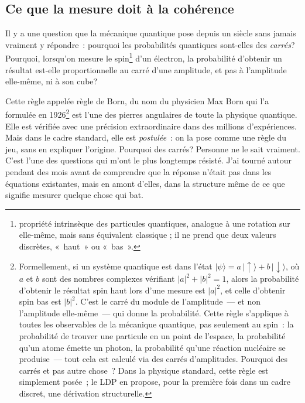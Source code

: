 \documentclass[12pt, a4paper, openright]{book}
\begin{document}
\subsection*{Ce que la mesure doit à la cohérence}

Il y a une question que la mécanique quantique pose depuis un siècle sans jamais vraiment y répondre~: pourquoi les probabilités quantiques sont-elles des \emph{carrés}? Pourquoi, lorsqu'on mesure le spin\footnote{propriété intrinsèque des particules quantiques, analogue à une rotation sur elle-même, mais sans équivalent classique ; il ne prend que deux valeurs discrètes, «~haut~» ou «~bas~».} d'un électron, la probabilité d'obtenir un résultat est-elle proportionnelle au carré d'une amplitude, et pas à l'amplitude elle-même, ni à son cube?

\medskip

Cette règle appelée règle de Born, du nom du physicien Max Born qui l'a formulée en 1926\footnote{%
    Formellement, si un système quantique est dans l'état $|\psi\rangle = a\,|\!\uparrow\rangle + b\,|\!\downarrow\rangle$, où $a$ et $b$ sont des nombres complexes vérifiant $|a|^2 + |b|^2 = 1$, alors la probabilité d'obtenir le résultat \og spin haut\fg{} lors d'une mesure est $|a|^2$, et celle d'obtenir \og spin bas\fg{} est $|b|^2$. C'est le carré du module de l'amplitude~--- et non l'amplitude elle-même~--- qui donne la probabilité. Cette règle s'applique à toutes les observables de la mécanique quantique, pas seulement au spin~: la probabilité de trouver une particule en un point de l'espace, la probabilité qu'un atome émette un photon, la probabilité qu'une réaction nucléaire se produise~--- tout cela est calculé via des carrés d'amplitudes. Pourquoi des carrés et pas autre chose~? Dans la physique standard, cette règle est simplement posée~; le LDP en propose, pour la première fois dans un cadre discret, une dérivation structurelle.} 
est l'une des pierres angulaires de toute la physique quantique. Elle est vérifiée avec une précision extraordinaire dans des millions d'expériences. Mais dans le cadre standard, elle est \emph{postulée}~: on la pose comme une règle du jeu, sans en expliquer l'origine. Pourquoi des carrés? Personne ne le sait vraiment. C'est l'une des questions qui m'ont le plus longtemps résisté. J'ai tourné autour pendant des mois avant de comprendre que la réponse n'était pas dans les équations existantes, mais en amont d'elles, dans la structure même de ce que signifie mesurer quelque chose qui bat. 

\medskip
\end{document}
